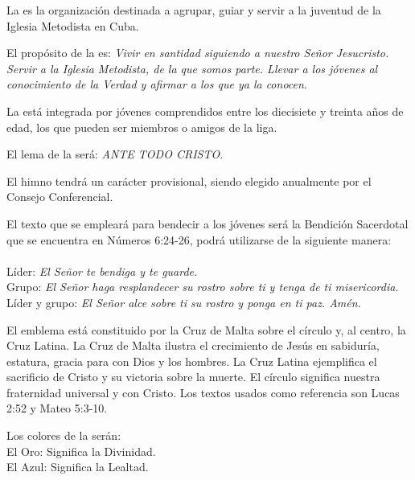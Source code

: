 

\article
\label{definicion-liga}
La \LMJ{} es la organización destinada a agrupar, guiar y servir a la juventud de la Iglesia Metodista en Cuba.

\article
\label{proposito-liga}
El propósito de la \LMJ{} es: \emph{Vivir en santidad siguiendo a nuestro Señor Jesucristo. Servir a la Iglesia Metodista, de la que somos parte. Llevar a los jóvenes al conocimiento de la Verdad y afirmar a los que ya la conocen}.

\article
\label{composicion-liga}
La \LMJ{} está integrada por jóvenes comprendidos entre los diecisiete y treinta años de edad, los que pueden ser miembros o amigos de la liga.

\article
El lema de la \LMJ{} será: \emph{ANTE TODO CRISTO}.

\article
El himno tendrá un carácter provisional, siendo elegido anualmente por el Consejo Conferencial.

\article
\label{texto-liga}
El texto que se empleará para bendecir a los jóvenes será la Bendición Sacerdotal que se encuentra en Números 6:24-26, podrá utilizarse de la siguiente manera:\\ \\
Líder: \emph{El Señor te bendiga y te guarde.}\\
Grupo: \emph{El Señor haga resplandecer su rostro sobre ti y tenga de ti misericordia.}\\
Líder y grupo: \emph{El Señor alce sobre ti su rostro y ponga en ti paz. Amén.}

\article
\label{emblema-liga}
El emblema está constituido por la Cruz de Malta sobre el círculo y, al centro, la Cruz Latina. La Cruz de Malta ilustra el crecimiento de Jesús en sabiduría, estatura, gracia para con Dios y los hombres. La Cruz Latina ejemplifica el sacrificio de Cristo y su victoria sobre la muerte. El círculo significa nuestra fraternidad universal y con Cristo. Los textos usados como referencia son Lucas 2:52 y Mateo 5:3-10.

\article
Los colores de la \LMJ{} serán:\\
El Oro: Significa la Divinidad.\\
El Azul: Significa la Lealtad.

